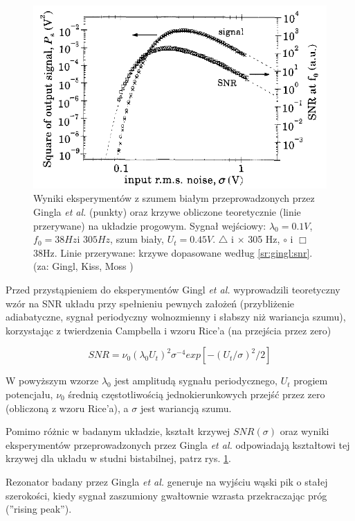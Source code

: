   \begin{figure}
    \includegraphics[width=120mm]{images/gingl_2.png}
    \caption{Wyniki eksperymentów z szumem białym przeprowadzonych przez Gingla \emph{et al.} (punkty) oraz krzywe obliczone teoretycznie (linie przerywane) na układzie progowym. Sygnał wejściowy: $\lambda_0 = 0.1V$, $f_0 = 38 Hz \text{i } 305 Hz $, szum biały, $U_t = 0.45V$. $\triangle$ i $\times$ 305 Hz, $\circ$ i $\Box$ 38Hz. Linie przerywane: krzywe dopasowane według \ref{sr:gingl:snr}. (za: Gingl, Kiss, Moss \cite{gingl_kiss_moss} )}
    \label{fig:graphics:gingl2}
  \end{figure}

  Przed przystąpieniem do eksperymentów Gingl \emph{et al.} wyprowadzili teoretyczny wzór na SNR układu przy spełnieniu pewnych założeń (przybliżenie adiabatyczne, sygnał periodyczny wolnozmienny i słabszy niż wariancja szumu), korzystając z twierdzenia Campbella i wzoru Rice'a (na przejścia przez zero) \cite{rice}

  \begin{equation} \label{sr:gingl:snr}
    SNR = \nu_0 (\lambda_0 U_t)^2 \sigma ^{-4} exp [-(U_t/{\sigma})^2 / 2]
  \end{equation}

  W powyższym wzorze $\lambda_0$ jest amplitudą sygnału periodycznego, $U_t$ progiem potencjału, $\nu_0$ średnią częstotliwością jednokierunkowych przejść przez zero (obliczoną z wzoru Rice'a), a $\sigma$ jest wariancją szumu.

  Pomimo różnic w badanym układzie, kształt krzywej $SNR(\sigma)$ oraz wyniki eksperymentów przeprowadzonych przez Gingla \emph{et al.} odpowiadają kształtowi tej krzywej dla układu w studni bistabilnej, patrz rys. \ref{fig:graphics:gingl2}.

  Rezonator badany przez Gingla \emph{et al.} generuje na wyjściu wąski pik o stałej szerokości, kiedy sygnał zaszumiony gwałtownie wzrasta przekraczając próg (''rising peak'').


